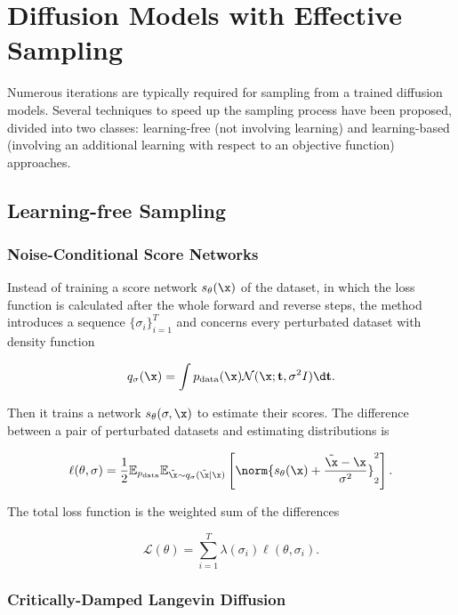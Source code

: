 \section{Diffusion Models with Effective Sampling}

Numerous iterations are typically required for sampling from a trained diffusion models. Several techniques to speed up the sampling process have been proposed, divided into two classes: learning-free (not involving learning) and learning-based (involving an additional learning with respect to an objective function) approaches.

\subsection{Learning-free Sampling}

\subsubsection{Noise-Conditional Score Networks}

Instead of training a score network $s_\theta(\x)$ of the dataset, in which the loss function is calculated after the whole forward and reverse steps, the method introduces a sequence $\{\sigma_i\}_{i=1}^T$ \cite{song2019generative} and concerns every perturbated dataset with density function

\begin{equation}
    q_\sigma(\x)=\int p_{\text{data}}(\x)\mathcal{N}(\x; \mathbf{t},\sigma^2I)\d \mathbf{t}.
\end{equation}

Then it trains a network $s_\theta(\sigma, \x)$ to estimate their scores. The difference between a pair of perturbated datasets and estimating distributions is

\begin{equation}
    \ell(\theta,\sigma) = \dfrac{1}{2}\mathbb{E}_{p_{\text{data}}}\mathbb{E}_{\tilde{\x}\sim q_\sigma(\tilde{\x}|\x)}\left[\norm{s_\theta(\x)+\dfrac{\tilde{\x}-\x}{\sigma^2}}^2_2\right].
\end{equation}

The total loss function is the weighted sum of the differences

\begin{equation}
    \mathcal{L}(\theta)=\sum\limits_{i=1}^T \lambda(\sigma_i)\ell(\theta,\sigma_i).
\end{equation}


\subsubsection{Critically-Damped Langevin Diffusion}



